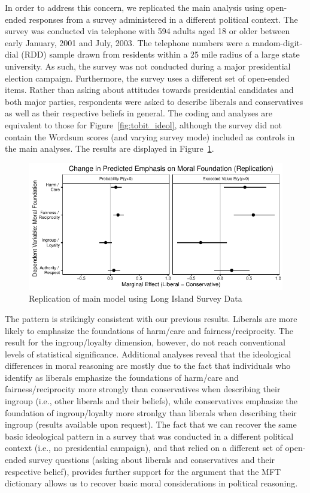 \documentclass[12pt]{article}
\begin{document}
In order to address this concern, we replicated the main analysis using open-ended responses from a survey administered in a different political context. The survey was conducted via telephone with 594 adults aged 18 or older between early January, 2001 and July, 2003. The telephone numbers were a random-digit-dial (RDD) sample drawn from residents within a 25 mile radius of a large state university. As such, the survey was not conducted during a  major presidential election campaign. Furthermore, the survey uses a different set of open-ended items. Rather than asking about attitudes towards presidential candidates and both major parties, respondents were asked to describe liberals and conservatives as well as their respective beliefs in general. The coding and analyses are equivalent to those for Figure~\ref{fig:tobit_ideol}, although the survey did not contain the Wordsum scores (and varying survey mode) included as controls in the main analyses. The results are displayed in Figure~\ref{fig:tobit_ideol_lisurvey}.

\begin{figure}[ht]\centering
\includegraphics{../calc/fig/tobit_ideol_lisurvey.pdf}
\caption{Replication of main model using Long Island Survey Data
}\label{fig:tobit_ideol_lisurvey}
\end{figure}

The pattern is strikingly consistent with our previous results. Liberals are more likely to emphasize the foundations of harm/care and fairness/reciprocity. The result for the ingroup/loyalty dimension, however, do not reach conventional levels of statistical significance. Additional analyses reveal that the ideological differences in moral reasoning are mostly due to the fact that individuals who identify as liberals emphasize the foundations of harm/care and fairness/reciprocity more strongly than conservatives when describing their ingroup (i.e., other liberals and their beliefs), while conservatives emphasize the foundation of ingroup/loyalty more stronlgy than liberals when describing their ingroup (results available upon request). The fact that we can recover the same basic ideological pattern in a survey that was conducted in a different political context (i.e., no presidential campaign), and that relied on a different set of open-ended survey questions (asking about liberals and conservatives and their respective belief), provides further support for the argument that the MFT dictionary allows us to recover basic moral considerations in political reasoning.
\end{document}
